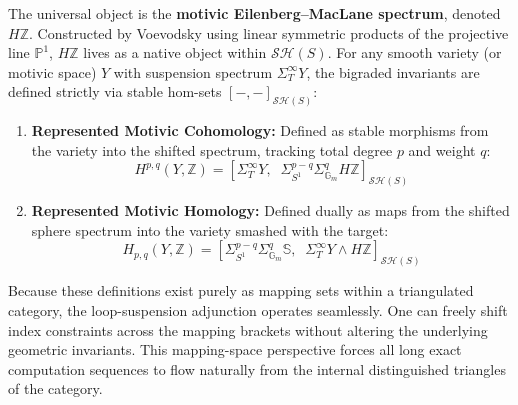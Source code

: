 \documentclass[11pt,oneside]{article}
\begin{document}
The universal object is the \textbf{motivic Eilenberg--MacLane spectrum}, denoted $H\mathbb{Z}$. Constructed by Voevodsky using linear symmetric products of the projective line $\mathbb{P}^1$, $H\mathbb{Z}$ lives as a native object within $\mathcal{S}\mathcal{H}(S)$. For any smooth variety (or motivic space) $Y$ with suspension spectrum $\Sigma_T^\infty Y$, the bigraded invariants are defined strictly via stable hom-sets $[-, -]_{\mathcal{S}\mathcal{H}(S)}$:
\begin{enumerate}
    \item \textbf{Represented Motivic Cohomology:} Defined as stable morphisms from the variety into the shifted spectrum, tracking total degree $p$ and weight $q$:
    \[ H^{p,q}(Y, \mathbb{Z}) = \left[ \Sigma_T^\infty Y, \;\; \Sigma_{S^1}^{p-q}\Sigma_{\mathbb{G}_m}^q H\mathbb{Z} \right]_{\mathcal{S}\mathcal{H}(S)} \]
    \item \textbf{Represented Motivic Homology:} Defined dually as maps from the shifted sphere spectrum into the variety smashed with the target:
    \[ H_{p,q}(Y, \mathbb{Z}) = \left[ \Sigma_{S^1}^{p-q}\Sigma_{\mathbb{G}_m}^q \mathbb{S}, \;\; \Sigma_T^\infty Y \wedge H\mathbb{Z} \right]_{\mathcal{S}\mathcal{H}(S)} \]
\end{enumerate}
Because these definitions exist purely as mapping sets within a triangulated category, the loop-suspension adjunction operates seamlessly. One can freely shift index constraints across the mapping brackets without altering the underlying geometric invariants. This mapping-space perspective forces all long exact computation sequences to flow naturally from the internal distinguished triangles of the category.
\end{document}
